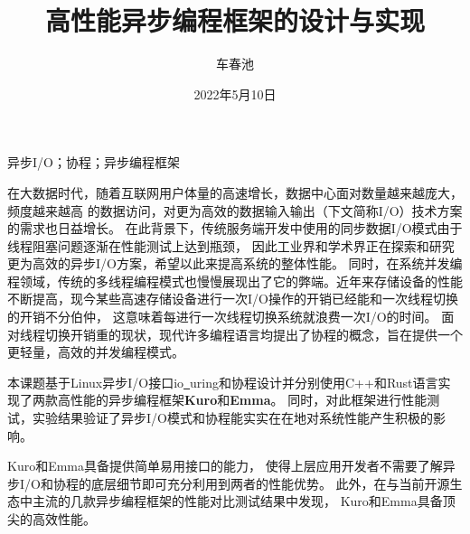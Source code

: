 \documentclass[supercite]{HustGraduPaper}
\title{高性能异步编程框架的设计与实现}
\author{车春池}
\date{2022年5月10日}
\theoremstyle{definition}
\begin{document}
\maketitle

\statement

\clearpage


\begin{cnabstract}{异步I/O；协程；异步编程框架}

在大数据时代，随着互联网用户体量的高速增长，数据中心面对数量越来越庞大，频度越来越高
的数据访问，对更为高效的数据输入输出（下文简称I/O）技术方案的需求也日益增长。
在此背景下，传统服务端开发中使用的同步数据I/O模式由于线程阻塞问题逐渐在性能测试上达到瓶颈，
因此工业界和学术界正在探索和研究更为高效的异步I/O方案，希望以此来提高系统的整体性能。
同时，在系统并发编程领域，传统的多线程编程模式也慢慢展现出了它的弊端。近年来存储设备的性能
不断提高，现今某些高速存储设备进行一次I/O操作的开销已经能和一次线程切换的开销不分伯仲，
这意味着每进行一次线程切换系统就浪费一次I/O的时间。
面对线程切换开销重的现状，现代许多编程语言均提出了协程的概念，旨在提供一个更轻量，高效的并发编程模式。\par

  本课题基于Linux异步I/O接口io\underline{~}uring和协程设计并分别使用C++和Rust语言实现了两款高性能的异步编程框架\textbf{Kuro}和\textbf{Emma}。
同时，对此框架进行性能测试，实验结果验证了异步I/O模式和协程能实实在在地对系统性能产生积极的影响。\par

Kuro和Emma具备提供简单易用接口的能力，
使得上层应用开发者不需要了解异步I/O和协程的底层细节即可充分利用到两者的性能优势。
此外，在与当前开源生态中主流的几款异步编程框架的性能对比测试结果中发现，
Kuro和Emma具备顶尖的高效性能。\par

\end{cnabstract}
\end{document}
